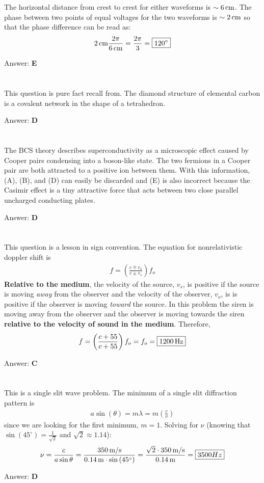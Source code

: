 \documentclass[12pt]{article}
\newcommand{\Answer}[1]{Answer: \textbf{#1}}
\newcommand{\Problem}[3]{
    \setcounter{section}{#1}
    \addtocounter{section}{-1}
    \section{}
    #3\par\par
    \Answer{#2}
}
\begin{document}
\Problem{42}{E}{%
The horizontal distance from crest to crest for either waveforms is $\sim 6\,\text{cm}$. The phase between two points of equal voltages for the two waveforms is $\sim 2\,\text{cm}$ so that the phase difference can be read as:
\begin{align}
2\,\text{cm} \frac{2 \pi}{6\,\text{cm}} = \frac{2 \pi}{3} = \boxed{{120}^{\circ}}\nonumber
\end{align}
}

\Problem{43}{D}{%
This question is pure fact recall from. The diamond structure of elemental carbon is a covalent network in the shape of a tetrahedron.
}

\Problem{44}{D}{%
The BCS theory describes superconductivity as a microscopic effect caused by Cooper pairs condensing into a boson-like state. The two fermions in a Cooper pair are both attracted to a positive ion between them. With this information, (A), (B), and (D) can easily be discarded and (E) is also incorrect because the Casimir effect is a tiny attractive force that acts between two close parallel uncharged conducting plates.
}

\Problem{45}{C}{%
This question is a lesson in sign convention. The equation for nonrelativistic doppler shift is
\begin{align}
f = \left(\frac{c \mp v_{o}}{c \pm v_{s}}\right) f_{o}
\end{align}
\textbf{Relative to the medium}, the velocity of the source, $v_{s}$, is positive if the source is moving \textit{away} from the observer and the velocity of the observer, $v_{o}$, is is positive if the observer is moving \textit{toward} the source. In this problem the siren is moving away from the observer and the observer is moving towards the siren \textbf{relative to the velocity of sound in the medium}. Therefore,
\begin{align}
f = \left(\frac{c + 55}{c + 55}\right) f_{o} = f_{o} = \boxed{1200\,\text{Hz}}\nonumber
\end{align}
}

\Problem{46}{D}{%
This is a single slit wave problem. The minimum of a single slit diffraction pattern is
\begin{align}
a \sin(\theta) = m \lambda = m \left(\frac{c}{\nu}\right)
\end{align}
since we are looking for the first minimum, $m = 1$. Solving for $\nu$ (knowing that $\sin{(45^{\circ})} = \frac{1}{\sqrt{2}}$ and $\sqrt{2} \approx 1.14$):
\begin{align}
\nu = \frac{c}{a \sin{\theta} } = \frac{350\,\text{m/s}}{0.14\,\text{m} \cdot \sin{(45^{\circ})}} = \frac{\sqrt{2} \cdot 350\,\text{m/s}}{0.14\,\text{m} } =\boxed{3500{Hz}}\nonumber
\end{align}
}
\end{document}
